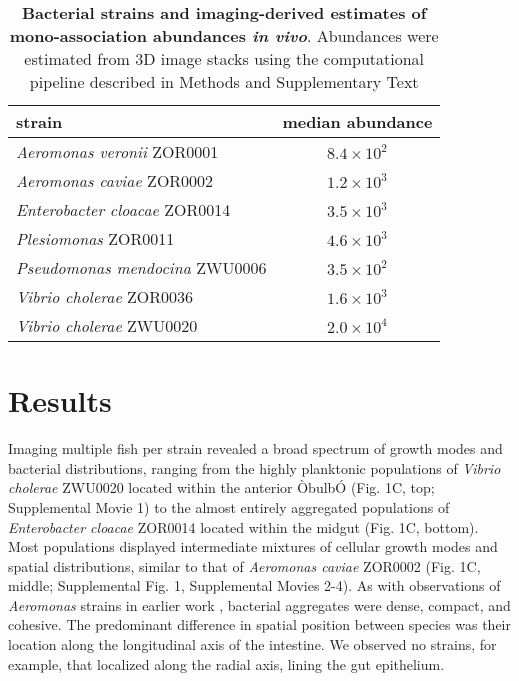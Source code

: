 \begin{table}
\centering
\begin{tabular}{l c }
\midrule
 strain               & median abundance     \\
\midrule
\textit{Aeromonas veronii} ZOR0001 &    $8.4 \times 10^2$                \\
\textit{Aeromonas caviae} ZOR0002 &   $1.2 \times 10^3$                  \\
\textit{Enterobacter cloacae} ZOR0014   &   $ 3.5 \times 10^3$            \\
\textit{Plesiomonas} ZOR0011      &  $ 4.6 \times 10^3 $      \\
\textit{Pseudomonas mendocina} ZWU0006         &   $3.5 \times 10^2$               \\
\textit{Vibrio cholerae} ZOR0036       &    $1.6 \times 10^3$                 \\
\textit{Vibrio cholerae} ZWU0020       &    $2.0 \times 10^4$                 \\
\midrule        
\end{tabular}\caption{\textbf{Bacterial strains and imaging-derived estimates of mono-association abundances \textit{in vivo}}.  Abundances were estimated from 3D image stacks using the computational pipeline described in Methods and Supplementary Text}
\end{table}



\section*{Results}


Imaging multiple fish per strain revealed a broad spectrum of growth modes and bacterial distributions, ranging from the highly planktonic populations of \textit{Vibrio cholerae} ZWU0020 located within the anterior ÒbulbÓ (Fig. 1C, top; Supplemental Movie 1) to the almost entirely aggregated populations of \textit{Enterobacter cloacae} ZOR0014 located within the midgut (Fig. 1C, bottom). Most populations displayed intermediate mixtures of cellular growth modes and spatial distributions, similar to that of \textit{Aeromonas caviae} ZOR0002 (Fig. 1C, middle; Supplemental Fig. 1, Supplemental Movies 2-4). As with observations of \textit{Aeromonas} strains in earlier work \cite{Wiles2016}, bacterial aggregates were dense, compact, and cohesive. The predominant difference in spatial position between species was their location along the longitudinal axis of the intestine. We observed no strains, for example, that localized along the radial axis, lining the gut epithelium.	

